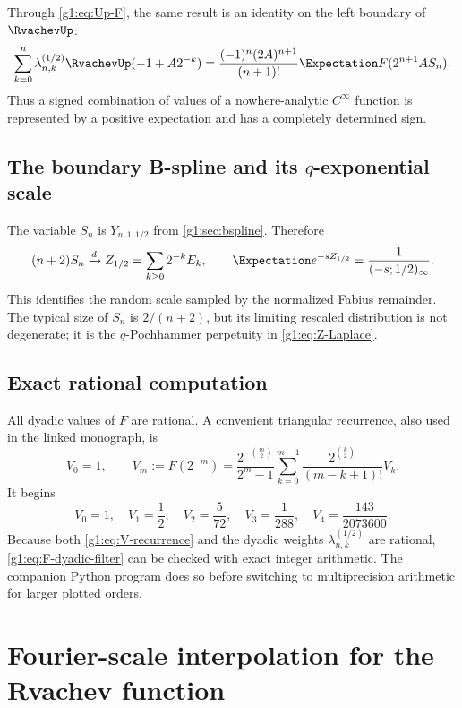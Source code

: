 Through \eqref{g1:eq:Up-F}, the same result is an identity on the left boundary of
$\RvachevUp$:
\begin{equation}
 \sum_{k=0}^n\lambda_{n,k}^{(1/2)}
 \RvachevUp(-1+A2^{-k})
 =\frac{(-1)^n(2A)^{n+1}}{(n+1)!}
 \Expectation F(2^{n+1}AS_n).
 \label{g1:eq:Up-boundary-filter}
\end{equation}
Thus a signed combination of values of a nowhere-analytic $C^\infty$ function
is represented by a positive expectation and has a completely determined
sign.

\subsection{The boundary B-spline and its $q$-exponential scale}

The variable $S_n$ is $Y_{n,1,1/2}$ from \cref{g1:sec:bspline}.  Therefore
\begin{equation}
 (n+2)S_n\xrightarrow{d}Z_{1/2}
 =\sum_{k\ge0}2^{-k}E_k,
 \qquad
 \Expectation e^{-sZ_{1/2}}=\frac1{(-s;1/2)_\infty}.
 \label{g1:eq:Sn-limit}
\end{equation}
This identifies the random scale sampled by the normalized Fabius remainder.
The typical size of $S_n$ is $2/(n+2)$, but its limiting rescaled distribution
is not degenerate; it is the $q$-Pochhammer perpetuity in
\eqref{g1:eq:Z-Laplace}.

\subsection{Exact rational computation}

All dyadic values of $F$ are rational.  A convenient triangular recurrence,
also used in the linked monograph, is
\begin{equation}
 V_0=1,\qquad
 V_m:=F(2^{-m})
 =\frac{2^{-\binom m2}}{2^m-1}
 \sum_{k=0}^{m-1}
 \frac{2^{\binom k2}}{(m-k+1)!}V_k.
 \label{g1:eq:V-recurrence}
\end{equation}
It begins
\[
 V_0=1,\quad V_1=\frac12,\quad V_2=\frac5{72},\quad
 V_3=\frac1{288},\quad V_4=\frac{143}{2073600}.
\]
Because both \eqref{g1:eq:V-recurrence} and the dyadic weights
$\lambda_{n,k}^{(1/2)}$ are rational, \eqref{g1:eq:F-dyadic-filter} can be checked
with exact integer arithmetic.  The companion Python program does so before
switching to multiprecision arithmetic for larger plotted orders.

\section{Fourier-scale interpolation for the Rvachev function}
\label{g1:sec:fourier}

